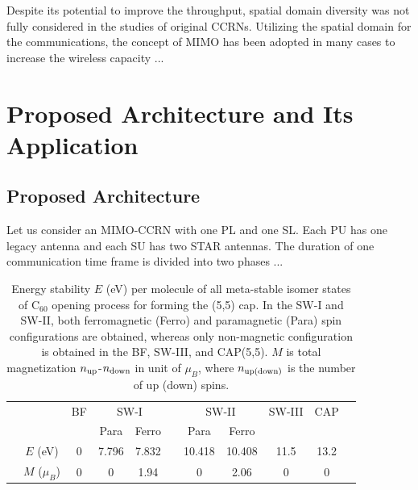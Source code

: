 \documentclass[master,english,final]{kaist-ucs}
\begin{document}
Despite its potential to improve the throughput, spatial domain diversity was not fully considered in the studies of original CCRNs. Utilizing the spatial domain for the communications, the concept of MIMO has been adopted in many cases to increase the wireless capacity \cite{EF1,FD2}...


\chapter{Proposed Architecture and Its Application}

\section{Proposed Architecture}

Let us consider an MIMO-CCRN with one PL and one SL. Each PU has one legacy antenna and each SU has two STAR antennas. The duration of one communication time frame is divided into two phases \cite{RVP2,ML2} ...
\begin{table}[t]
\caption[Enter the caption title here]{Energy stability $E$ (eV) per molecule of all meta-stable
isomer states of C$_{60}$ opening process for forming the (5,5) cap.
In the SW-I and SW-II, both ferromagnetic (Ferro) and paramagnetic (Para)
spin configurations are obtained, whereas only non-magnetic configuration
is obtained in the BF, SW-III, and CAP(5,5).
$M$ is total magnetization $n_{\rm up}$-$n_{\rm down}$ in unit of $\mu_B$, where
$n_{\rm up(down)}$ is the number of up (down) spins.
}
\label{mag-tab1}
\begin{center}
\begin{tabular} {ccccccccccc}
\hline\hline
& & BF &\multicolumn{2}{c}{SW-I}&&\multicolumn{2}{c}{SW-II}&SW-III&CAP&\\
\cline{4-5} \cline{7-8}
&               &   &  Para & Ferro &&   Para &  Ferro &      &      &\\
\hline
& $E$ (eV)      & 0 & 7.796 & 7.832 && 10.418 & 10.408 & 11.5 & 13.2 &\\
& $M$ ($\mu_B$) & 0 &     0 &  1.94 &&      0 &   2.06 &    0 &    0 &\\
\hline\hline
\end{tabular}
\end{center}
\end{table}
\end{document}
